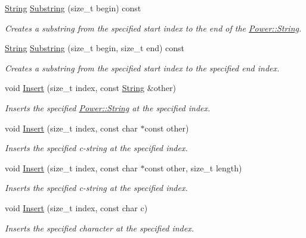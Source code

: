 \begin{DoxyCompactItemize}
\hyperlink{class_power_1_1_string}{String} \hyperlink{class_power_1_1_string_a754d4d67de005b89aba041db5f551e1c}{Substring} (size\+\_\+t begin) const
\begin{DoxyCompactList}\small\item\em Creates a substring from the specified start index to the end of the \hyperlink{class_power_1_1_string}{Power\+::\+String}. \end{DoxyCompactList}\item 
\hyperlink{class_power_1_1_string}{String} \hyperlink{class_power_1_1_string_a648cd16b1af13b87a20d623d933f067c}{Substring} (size\+\_\+t begin, size\+\_\+t end) const
\begin{DoxyCompactList}\small\item\em Creates a substring from the specified start index to the specified end index. \end{DoxyCompactList}\item 
void \hyperlink{class_power_1_1_string_ae299096a84ec36c3a7d334ecbd98c8ac}{Insert} (size\+\_\+t index, const \hyperlink{class_power_1_1_string}{String} \&other)
\begin{DoxyCompactList}\small\item\em Inserts the specified \hyperlink{class_power_1_1_string}{Power\+::\+String} at the specified index. \end{DoxyCompactList}\item 
void \hyperlink{class_power_1_1_string_aae39de09c7d011d58c067545cbec254a}{Insert} (size\+\_\+t index, const char $\ast$const other)
\begin{DoxyCompactList}\small\item\em Inserts the specified c-\/string at the specified index. \end{DoxyCompactList}\item 
void \hyperlink{class_power_1_1_string_a9f13e94b3e64c51f1c3d809f2ac34b47}{Insert} (size\+\_\+t index, const char $\ast$const other, size\+\_\+t length)
\begin{DoxyCompactList}\small\item\em Inserts the specified c-\/string at the specified index. \end{DoxyCompactList}\item 
void \hyperlink{class_power_1_1_string_a07dc9c5bdb8dfc2dff7a49d5464b1017}{Insert} (size\+\_\+t index, const char c)
\begin{DoxyCompactList}\small\item\em Inserts the specified character at the specified index. \end{DoxyCompactList}\item 

\end{DoxyCompactItemize}
